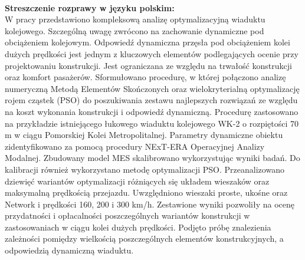 \begin{myfont}
	\pagebreak[4]
	
	\thispagestyle{plain}
	\noindent
	\\
	\textbf{Streszczenie rozprawy w języku polskim:}\\
	W pracy przedstawiono kompleksową analizę optymalizacyjną wiaduktu kolejowego. Szczególną uwagę zwrócono na zachowanie dynamiczne pod obciążeniem kolejowym. Odpowiedź dynamiczna przęsła pod obciążeniem kolei dużych prędkości jest jednym z kluczowych elementów podlegających ocenie przy projektowaniu konstrukcji. Jest ograniczana ze względu na trwałość konstrukcji oraz komfort pasażerów. Sformułowano procedurę, w której połączono analizę numeryczną Metodą Elementów Skończonych oraz wielokryterialną optymalizację rojem cząstek (PSO) do poszukiwania zestawu najlepszych rozwiązań ze względu na koszt wykonania konstrukcji i odpowiedź dynamiczną. Procedurę zastosowano na przykładzie istniejącego łukowego wiaduktu kolejowego WK-2 o rozpiętości 70 m w ciągu Pomorskiej Kolei Metropolitalnej. Parametry dynamiczne obiektu zidentyfikowano za pomocą procedury NExT-ERA Operacyjnej Analizy Modalnej. Zbudowany model MES skalibrowano wykorzystując wyniki badań. Do kalibracji również wykorzystano metodę optymalizacji PSO. Przeanalizowano dziewięć wariantów optymalizacji różniących się układem wieszaków oraz maksymalną prędkością przejazdu. Uwzględniono wieszaki proste, ukośne oraz Network i prędkości 160, 200 i 300 km/h. Zestawione wyniki pozwoliły na ocenę przydatności i opłacalności poszczególnych wariantów konstrukcji w zastosowaniach w ciągu kolei dużych prędkości. Podjęto próbę znalezienia zależności pomiędzy wielkością poszczególnych elementów konstrukcyjnych, a odpowiedzią dynamiczną wiaduktu.
	

\end{myfont}
